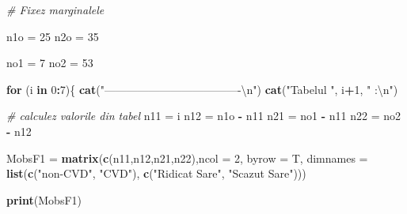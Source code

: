 \documentclass[]{article}
\newenvironment{Shaded}{\begin{snugshade}}{\end{snugshade}}
\newcommand{\KeywordTok}[1]{\textcolor[rgb]{0.13,0.29,0.53}{\textbf{#1}}}
\newcommand{\DataTypeTok}[1]{\textcolor[rgb]{0.13,0.29,0.53}{#1}}
\newcommand{\DecValTok}[1]{\textcolor[rgb]{0.00,0.00,0.81}{#1}}
\newcommand{\CharTok}[1]{\textcolor[rgb]{0.31,0.60,0.02}{#1}}
\newcommand{\StringTok}[1]{\textcolor[rgb]{0.31,0.60,0.02}{#1}}
\newcommand{\CommentTok}[1]{\textcolor[rgb]{0.56,0.35,0.01}{\textit{#1}}}
\newcommand{\ControlFlowTok}[1]{\textcolor[rgb]{0.13,0.29,0.53}{\textbf{#1}}}
\newcommand{\OperatorTok}[1]{\textcolor[rgb]{0.81,0.36,0.00}{\textbf{#1}}}
\newcommand{\NormalTok}[1]{#1}
\begin{document}
\begin{Shaded}
\begin{Highlighting}[]
\CommentTok{# Fixez marginalele}

\NormalTok{n1o =}\StringTok{ }\DecValTok{25}
\NormalTok{n2o =}\StringTok{ }\DecValTok{35}
  
\NormalTok{no1 =}\StringTok{ }\DecValTok{7}
\NormalTok{no2 =}\StringTok{ }\DecValTok{53}

\ControlFlowTok{for}\NormalTok{ (i }\ControlFlowTok{in} \DecValTok{0}\OperatorTok{:}\DecValTok{7}\NormalTok{)\{}
  \KeywordTok{cat}\NormalTok{(}\StringTok{"-------------------------------------}\CharTok{\textbackslash{}n}\StringTok{"}\NormalTok{)}
  \KeywordTok{cat}\NormalTok{(}\StringTok{"Tabelul "}\NormalTok{, i}\OperatorTok{+}\DecValTok{1}\NormalTok{, }\StringTok{" :}\CharTok{\textbackslash{}n}\StringTok{"}\NormalTok{)}
  
  \CommentTok{# calculez valorile din tabel}
\NormalTok{  n11 =}\StringTok{ }\NormalTok{i}
\NormalTok{  n12 =}\StringTok{ }\NormalTok{n1o }\OperatorTok{-}\StringTok{ }\NormalTok{n11}
\NormalTok{  n21 =}\StringTok{ }\NormalTok{no1 }\OperatorTok{-}\StringTok{ }\NormalTok{n11}
\NormalTok{  n22 =}\StringTok{ }\NormalTok{no2 }\OperatorTok{-}\StringTok{ }\NormalTok{n12}
  
\NormalTok{  MobsF1 =}\StringTok{ }\KeywordTok{matrix}\NormalTok{(}\KeywordTok{c}\NormalTok{(n11,n12,n21,n22),}\DataTypeTok{ncol =} \DecValTok{2}\NormalTok{, }\DataTypeTok{byrow =}\NormalTok{ T, }
                  \DataTypeTok{dimnames =} \KeywordTok{list}\NormalTok{(}\KeywordTok{c}\NormalTok{(}\StringTok{"non-CVD"}\NormalTok{, }\StringTok{"CVD"}\NormalTok{), }
                                  \KeywordTok{c}\NormalTok{(}\StringTok{"Ridicat Sare"}\NormalTok{, }\StringTok{"Scazut Sare"}\NormalTok{)))}
  
  \KeywordTok{print}\NormalTok{(MobsF1)}
  

\end{Highlighting}
\end{Shaded}
\end{document}
